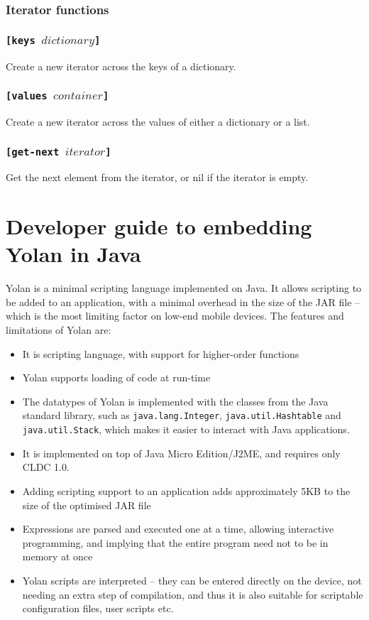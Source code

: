 \documentclass[11pt]{report}
\begin{document}
\subsubsection{Iterator functions}
\subsubsection*{\tt{[keys }$dictionary$\tt{]}}
Create a new iterator across the keys of a dictionary.
\subsubsection*{\tt{[values }$container$\tt{]}}
Create a new iterator across the values of either a dictionary or a list.
\subsubsection*{\tt{[get-next }$iterator$\tt{]}}
Get the next element from the iterator, or nil if the iterator is empty.

\section{Developer guide to embedding Yolan in Java}
Yolan is a minimal scripting language implemented on Java.
It allows scripting to be added to an application, with a minimal overhead in the size of the JAR file -- which is the most limiting factor on low-end mobile devices. The features and limitations of Yolan are:
\begin{itemize}
\item It is scripting language, with support for higher-order functions
\item Yolan supports loading of code at run-time
\item The datatypes of Yolan is implemented with the classes from the Java standard library, such as \verb|java.lang.Integer|, \verb|java.util.Hashtable| and \verb|java.util.Stack|, which makes it easier to interact with Java applications.
\item It is implemented on top of Java Micro Edition/J2ME, and requires only CLDC 1.0.
\item Adding scripting support to an application adds approximately 5KB to the size of the optimised JAR file
\item Expressions are parsed and executed one at a time, allowing interactive programming, and implying that the entire program need not to be in memory at once
\item Yolan scripts are interpreted -- they can be entered directly on the device, not needing an extra step of compilation, and thus it is also suitable for scriptable configuration files, user scripts etc.
\end{itemize}
\end{document}
